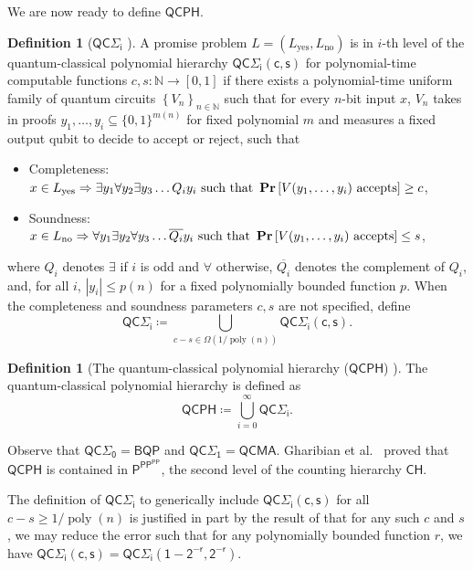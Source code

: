 \documentclass[10pt,a4paper]{article}
\theoremstyle{definition}
\newtheorem{definition}[theorem]{Definition}
\renewcommand{\Pr}{\mathop{\bf Pr\/}}
\DeclareMathOperator{\poly}{poly}
\newcommand{\yes}{\text{yes}}
\newcommand{\no}{\text{no}}
\newcommand{\nats}{\mathbb N}
\newcommand{\N}{\nats}
\newcommand{\class}[1]{\ensuremath{\mathsf{#1}}\xspace}
\newcommand{\PTIME}{\class{P}}
\newcommand{\BQP}{\class{BQP}}
\newcommand{\QCMA}{\class{QCMA}}
\newcommand{\CH}{\class{CH}}
\newcommand{\PP}{\class{PP}}
\newcommand{\QCPH}{\class{QCPH}}
\newcommand{\QCSigmai}[1][i]{\class{QC\Sigma_{#1}}}
\newcommand{\abs}[1]{\left\lvert #1 \right\rvert}
\begin{document}
We are now ready to define $\QCPH$.

\begin{definition}[$\QCSigmai$ \cite{GSSSY22_qph}] \label{def:qcsigmai}
    A promise problem $L=(L_\yes, L_\no)$ is in $i$-th level of the quantum-classical polynomial hierarchy $\QCSigmai[i]{}\class{(c,s)}$ for polynomial-time computable functions $c, s: \N \to [0,1]$ if there exists a polynomial-time uniform family of quantum circuits $\left\{V_n \right\}_{n \in \N}$ such that for every $n$-bit input $x$, $V_n$ takes in proofs $y_1, \dots, y_i \subseteq \{0,1\}^{m(n)}$ for fixed polynomial $m$ and measures a fixed output qubit to decide to accept or reject, such that
    \begin{itemize}
        \item Completeness: $ x \in L_\yes \Rightarrow  \exists y_1 \forall y_2 \exists y_3 \dots Q_i y_i \text{ such that } \Pr\left[ V( y_1, \dots, y_i) \text{ accepts}\right] \geq c $,
        \item Soundness: $ x\in L_\no \Rightarrow  \forall y_1 \exists y_2  \forall y_3 \dots \overline{Q_i} y_i  \text{ such that } \Pr\left[ V(y_1, \dots, y_i) \text{ accepts}\right] \leq s $,
    \end{itemize}
   where $Q_i$ denotes $\exists$ if $i$ is odd and $\forall$ otherwise, $\overline{Q_i}$ denotes the complement of $Q_i$, and, for all $i$, $\abs{y_i} \leq p(n)$ for a fixed polynomially bounded function $p$. 
   When the completeness and soundness parameters $c, s$ are not specified, define
    \[
        \QCSigmai[i] \coloneqq \bigcup_{c-s \in \Omega\left(1/\poly(n)\right)} \QCSigmai[i]\class{(c,s)}.
    \]
\end{definition}
\begin{definition}[The quantum-classical polynomial hierarchy ($\QCPH$) {\cite{GSSSY22_qph}}]
The quantum-classical polynomial hierarchy is defined as 
\[
\QCPH \coloneqq \bigcup_{i=0}^\infty \QCSigmai.
\]
\end{definition}

Observe that $\QCSigmai[0] = \BQP$ and $\QCSigmai[1] = \QCMA$. Gharibian et al.\ \cite{GSSSY22_qph} proved that $\QCPH$ is contained in $\PTIME^{\PP^\PP}$, the second level of the counting hierarchy $\CH$. 

The definition of $\QCSigmai[i]$ to generically include $\QCSigmai[i]\class{(c,s)}$ for all $c-s\geq 1/\poly(n)$ is justified in part by the result of \cite{GSSSY22_qph} that for any such $c$ and $s$, we may reduce the error such that for any polynomially bounded function $r$, we have
$\QCSigmai[i]\class{(c,s)} = \QCSigmai[i]\class{(1-2^{-r},2^{-r})}$.
\end{document}
